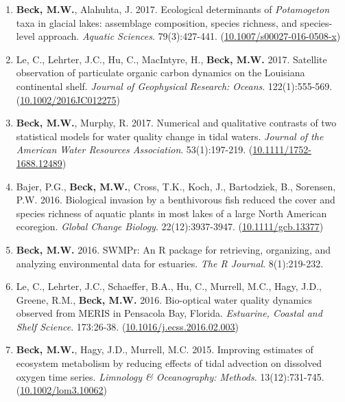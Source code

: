 \documentclass[letterpaper,12pt]{article}
\begin{document}
\begin{enumerate}
\item \textbf{Beck, M.W.}, Alahuhta, J. 2017. Ecological determinants of \textit{Potamogeton} taxa in glacial lakes: assemblage composition, species richness, and species-level approach. \textit{Aquatic Sciences}. 79(3):427-441. ({\footnotesize\href{https://doi.org/10.1007/s00027-016-0508-x}{10.1007/s00027-016-0508-x}})

\item Le, C., Lehrter, J.C., Hu, C., MacIntyre, H., \textbf{Beck, M.W.} 2017. Satellite observation of particulate organic carbon dynamics on the Louisiana continental shelf. \textit{Journal of Geophysical Research: Oceans}. 122(1):555-569. ({\footnotesize\href{http://dx.doi.org/10.1002/2016JC012275}{10.1002/2016JC012275}})

\item \textbf{Beck, M.W.}, Murphy, R. 2017. Numerical and qualitative contrasts of two statistical models for water quality change in tidal waters. \textit{Journal of the American Water Resources Association}. 53(1):197-219. ({\footnotesize\href{http://dx.doi.org/10.1111/1752-1688.12489}{10.1111/1752-1688.12489}})

\item Bajer, P.G., \textbf{Beck, M.W.}, Cross, T.K., Koch, J., Bartodziek, B., Sorensen, P.W. 2016. Biological invasion by a benthivorous fish reduced the cover and species richness of aquatic plants in most lakes of a large North American ecoregion. \textit{Global Change Biology}. 22(12):3937-3947. ({\footnotesize\href{http://dx.doi.org/10.1111/gcb.13377}{10.1111/gcb.13377}})

\item \textbf{Beck, M.W.} 2016. SWMPr: An R package for retrieving, organizing, and analyzing environmental data for estuaries. \textit{The R Journal}. 8(1):219-232.

\item Le, C., Lehrter, J.C., Schaeffer, B.A., Hu, C., Murrell, M.C., Hagy, J.D., Greene, R.M., \textbf{Beck, M.W.} 2016. Bio-optical water quality dynamics observed from MERIS in Pensacola Bay, Florida. \textit{Estuarine, Coastal and Shelf Science}. 173:26-38. ({\footnotesize\href{https://doi.org/10.1016/j.ecss.2016.02.003}{10.1016/j.ecss.2016.02.003}})

\item \textbf{Beck, M.W.}, Hagy, J.D., Murrell, M.C. 2015. Improving estimates of ecosystem metabolism by reducing effects of tidal advection on dissolved oxygen time series. \textit{Limnology \& Oceanography: Methods}. 13(12):731-745. ({\footnotesize\href{http://dx.doi.org/10.1002/lom3.10062}{10.1002/lom3.10062}})


\end{enumerate}
\end{document}
